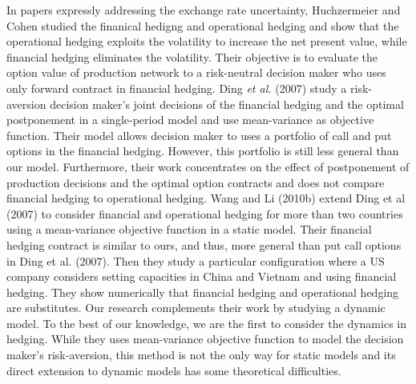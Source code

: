 \documentclass[mnsc,nonblindrev,copyedit]{informs2_wz} %
\begin{document}
In papers expressly addressing the exchange rate uncertainty, Huchzermeier and Cohen \cite{Huchzermeier} studied the finanical hedigng and operational hedging and show that the operational hedging exploits the volatility to increase the net present value, while financial hedging eliminates the volatility. Their objective is to evaluate the option value of production network to a risk-neutral decision maker who uses only forward contract in financial hedging.  Ding {\it et al.} (2007) study a risk-aversion decision maker's joint decisions of the financial hedging and the optimal postponement in a single-period model and use mean-variance as objective function. Their model allows decision maker to uses a portfolio of call and put options in the financial hedging. However, this portfolio is still less general than our model.  Furthermore, their work {concentrates} on the effect of postponement of production decisions and the optimal option contracts and does not compare financial hedging to operational hedging.
Wang and Li (2010b) extend Ding et al (2007) to consider financial and operational hedging for more than two countries using a mean-variance objective function in a static model. Their financial hedging contract is similar to ours, and thus, more general than put call options in Ding et al. (2007). Then they study a particular configuration where a US company considers setting capacities in China and Vietnam and using financial hedging. They show numerically that financial hedging and operational hedging are substitutes. Our research complements their work by studying a dynamic model. To the best of our knowledge, we are the first to consider the dynamics in hedging.  While they uses mean-variance objective function to model the decision maker's risk-aversion, this method is not the only way for static models and its direct extension to dynamic models has some theoretical difficulties. 
\end{document}
